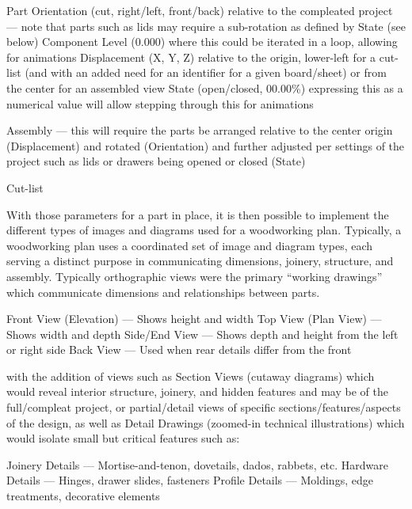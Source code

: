 \documentclass{ltxdoc}
\begin{document}
\begin{outline}
\1 Part
\2 Orientation (cut, right/left, front/back) relative to the compleated project --- note that parts such as lids may require a sub-rotation as defined by State (see below)
\2 Component Level (0.000) where this could be iterated in a loop, allowing for animations
\2 Displacement (X, Y, Z) relative to the origin, lower-left for a cut-list (and with an added need for an identifier for a given board/sheet) or from the center for an assembled view
\2 State (open/closed, 00.00\%) expressing this as a numerical value will allow stepping through this for animations

\1 Assembly --- this will require the parts be arranged relative to the center origin (Displacement) and rotated (Orientation) and further adjusted per settings of the project such as lids or drawers being opened or closed (State)

\1 Cut-list

\end{outline}

With those parameters for a part in place, it is then possible to implement the different types of images and diagrams used for a woodworking plan. Typically, a woodworking plan uses a coordinated set of image and diagram types, each serving a distinct purpose in communicating dimensions, joinery, structure, and assembly. Typically orthographic views were the primary ``working drawings'' which communicate dimensions and relationships between parts.

\begin{outline}
\1 Front View (Elevation) — Shows height and width
\1 Top View (Plan View) — Shows width and depth 
\1 Side/End View — Shows depth and height from the left or right side 
\1 Back View — Used when rear details differ from the front 
\end{outline}

\noindent with the addition of views such as Section Views (cutaway diagrams) which would reveal interior structure, joinery, and hidden features and may be of the full/compleat project, or partial/detail views of specific sections/features/aspects of the design, as well as Detail Drawings (zoomed-in technical illustrations) which would isolate small but critical features such as:

\begin{outline}
\1 Joinery Details --- Mortise-and-tenon, dovetails, dados, rabbets, etc. 
\1 Hardware Details --- Hinges, drawer slides, fasteners
\1 Profile Details --- Moldings, edge treatments, decorative elements
\end{outline}
\end{document}
